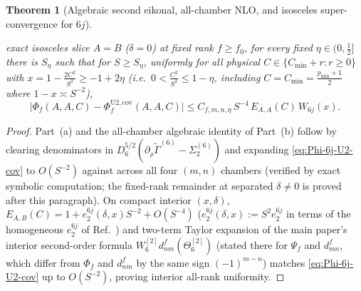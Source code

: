 \documentclass[11pt]{article}
\newtheorem{theorem}{Theorem}[section]
\theoremstyle{definition}
\theoremstyle{remark}
\renewcommand{\_}{\oldunderscore\penalty0\hskip0pt\relax}
\begin{document}
\begin{theorem}[Algebraic second eikonal, all-chamber NLO, and isosceles super-convergence for $6j$]
\begin{enumerate}[label=(\alph*),leftmargin=2em,itemsep=2pt]
  exact isosceles slice $A=B$ ($\delta=0$) at fixed rank $f\ge f_0$, for every fixed $\eta\in(0,\frac12]$ there is $S_\eta$ such that for
  $S\ge S_\eta$, uniformly for all physical $C\in\{C_{\min}+r:r\ge 0\}$ with
  $x=1-\frac{2C^2}{S^2}\ge -1+2\eta$ (i.e.\ $0<\frac{C^2}{S^2}\le 1-\eta$, including $C=C_{\min}=\frac{p_{\min}+1}{2}$
  where $1-x\asymp S^{-2}$),
\begin{equation}
  \bigl|\Phi_f(A,A,C) - \Phi_f^{\mathrm{U2,cov}}(A,A,C)\bigr| \le C_{f,m,n,\eta}\,S^{-4}\,E_{A,A}(C)\,W_{6j}(x).
  \label{eq:isosceles-S4}
\end{equation}
\end{enumerate}
\end{theorem}

\begin{proof}
Part~(a) and the all-chamber algebraic identity of Part~(b) follow by clearing denominators in
  $D_6^{5/2}(\partial_\rho\widetilde{\Gamma}^{(6)}-\Sigma_2^{(6)})$ and expanding \eqref{eq:Phi-6j-U2-cov} to $O(S^{-2})$ against
  \cite[Eq.~(262)]{LewisFixedRank} across all four $(m,n)$ chambers (verified by exact symbolic computation; the fixed-rank remainder at separated $\delta\ne 0$ is proved
  after this paragraph). On compact interior $(x,\delta)$, $E_{A,B}(C)=1+e_2^{6j}(\delta,x)S^{-2}+O(S^{-4})$ ($e_2^{6j}(\delta,x):=S^{2}e_2^{6j}$ in terms of the homogeneous $e_2^{6j}$ of Ref.~\cite{LewisFixedRank}) and
  two-term Taylor expansion of the main paper's interior second-order formula $W_6^{[2]}d^f_{nm}(\Theta_6^{[2]})$
  \cite[Corollary~5.3]{LewisGrowingRank} (stated there for $\Psi_f$ and $d^f_{mn}$, which differ from $\Phi_f$ and $d^f_{nm}$ by the same sign $(-1)^{m-n}$) matches \eqref{eq:Phi-6j-U2-cov} up to $O(S^{-2})$, proving interior all-rank
  uniformity.


\end{proof}
\end{document}
